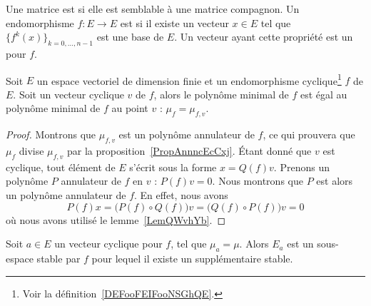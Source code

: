 \begin{definition}      \label{DEFooFEIFooNSGhQE}
    Une matrice est  si elle est semblable à une matrice compagnon. Un endomorphisme \( f\colon E\to E\) est  si il existe un vecteur \( x\in E\) tel que \( \{ f^k(x) \}_{k=0,\ldots, n-1} \) est une base de \( E\). Un vecteur ayant cette propriété est un  pour \( f\).
\end{definition}

\begin{lemma}   \label{LemAGZNNa}
    Soit \( E\) un espace vectoriel de dimension finie et un endomorphisme cyclique\footnote{Voir la définition~\ref{DEFooFEIFooNSGhQE}.} \( f\) de \( E\). Soit un vecteur cyclique \( v\) de \( f\), alors le polynôme minimal de \( f\) est égal au polynôme minimal de \( f\) au point \( v\) : \( \mu_{f}=\mu_{f,v}\).
\end{lemma}

\begin{proof}
    Montrons que \( \mu_{f,v}\) est un polynôme annulateur de \( f\), ce qui prouvera que \( \mu_f\) divise \( \mu_{f,v}\) par la proposition~\ref{PropAnnncEcCxj}. Étant donné que \( v\) est cyclique, tout élément de \( E\) s'écrit sous la forme \( x=Q(f)v\). Prenons un polynôme \( P\) annulateur de \( f\) en \( v\) : \( P(f)v=0\). Nous montrons que \( P\) est alors un polynôme annulateur de \( f\). En effet, nous avons
    \begin{equation}
        P(f)x=\big( P(f)\circ Q(f) \big)v=\big( Q(f)\circ P(f) \big)v=0
    \end{equation}
    où nous avons utilisé le lemme~\ref{LemQWvhYb}.
\end{proof}

\begin{lemma}        \label{LEMooOWDAooWPbPda}
    Soit \( a\in E\) un vecteur cyclique pour \( f\), tel que \( \mu_a=\mu\). Alors \( E_a\) est un sous-espace stable par \( f\) pour lequel il existe un supplémentaire stable.
\end{lemma}

